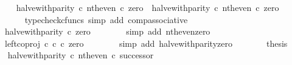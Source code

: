 \begin{isabellebody}
\ \ \ \ \isamarkupfalse%
\ {\isachardoublequoteopen}{\isacharparenleft}{\kern0pt}halve{\isacharunderscore}{\kern0pt}with{\isacharunderscore}{\kern0pt}parity\ {\isasymcirc}\isactrlsub c\ nth{\isacharunderscore}{\kern0pt}even{\isacharparenright}{\kern0pt}\ {\isasymcirc}\isactrlsub c\ zero\ {\isacharequal}{\kern0pt}\ halve{\isacharunderscore}{\kern0pt}with{\isacharunderscore}{\kern0pt}parity\ {\isasymcirc}\isactrlsub c\ nth{\isacharunderscore}{\kern0pt}even\ {\isasymcirc}\isactrlsub c\ zero{\isachardoublequoteclose}\isanewline
\ \ \ \ \ \ \isamarkupfalse%
\ {\isacharparenleft}{\kern0pt}typecheck{\isacharunderscore}{\kern0pt}cfuncs{\isacharcomma}{\kern0pt}\ simp\ add{\isacharcolon}{\kern0pt}\ comp{\isacharunderscore}{\kern0pt}associative{}{\isacharparenright}{\kern0pt}\isanewline
\ \ \ \ \isamarkupfalse%
\ \isamarkupfalse%
\ {\isachardoublequoteopen}{\isachardot}{\kern0pt}{\isachardot}{\kern0pt}{\isachardot}{\kern0pt}\ {\isacharequal}{\kern0pt}\ halve{\isacharunderscore}{\kern0pt}with{\isacharunderscore}{\kern0pt}parity\ {\isasymcirc}\isactrlsub c\ zero{\isachardoublequoteclose}\isanewline
\ \ \ \ \ \ \isamarkupfalse%
\ {\isacharparenleft}{\kern0pt}simp\ add{\isacharcolon}{\kern0pt}\ nth{\isacharunderscore}{\kern0pt}even{\isacharunderscore}{\kern0pt}zero{\isacharparenright}{\kern0pt}\isanewline
\ \ \ \ \isamarkupfalse%
\ \isamarkupfalse%
\ {\isachardoublequoteopen}{\isachardot}{\kern0pt}{\isachardot}{\kern0pt}{\isachardot}{\kern0pt}\ {\isacharequal}{\kern0pt}\ left{\isacharunderscore}{\kern0pt}coproj\ {\isasymnat}\isactrlsub c\ {\isasymnat}\isactrlsub c\ {\isasymcirc}\isactrlsub c\ zero{\isachardoublequoteclose}\isanewline
\ \ \ \ \ \ \isamarkupfalse%
\ {\isacharparenleft}{\kern0pt}simp\ add{\isacharcolon}{\kern0pt}\ halve{\isacharunderscore}{\kern0pt}with{\isacharunderscore}{\kern0pt}parity{\isacharunderscore}{\kern0pt}zero{\isacharparenright}{\kern0pt}\isanewline
\ \ \ \ \isamarkupfalse%
\ \isamarkupfalse%
\ {\isacharquery}{\kern0pt}thesis\isacommand{{\isachardot}{\kern0pt}}\isamarkupfalse%
\isanewline
\ \ \isamarkupfalse%
\isanewline
\isanewline
\ \ \isamarkupfalse%
\ {\isachardoublequoteopen}{\isacharparenleft}{\kern0pt}halve{\isacharunderscore}{\kern0pt}with{\isacharunderscore}{\kern0pt}parity\ {\isasymcirc}\isactrlsub c\ nth{\isacharunderscore}{\kern0pt}even{\isacharparenright}{\kern0pt}\ {\isasymcirc}\isactrlsub c\ successor\ {\isacharequal}{\kern0pt}\isanewline

\end{isabellebody}
